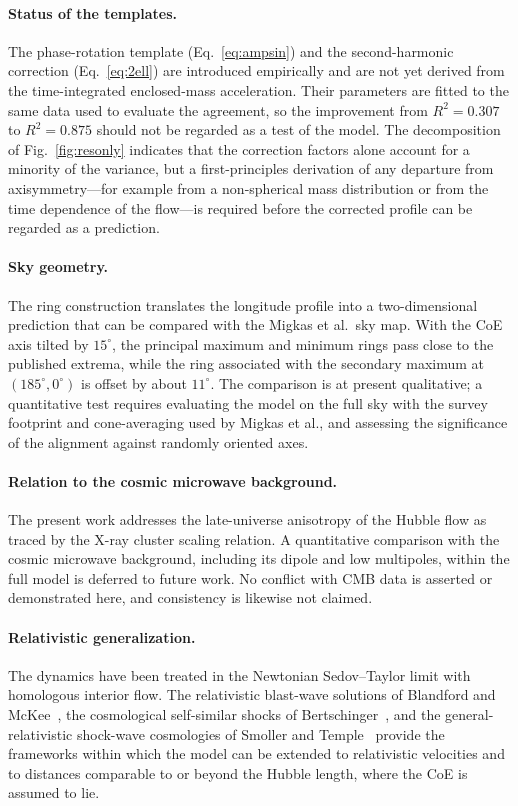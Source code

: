 \documentclass[11pt,letterpaper]{article}
\numberwithin{equation}{section}
\begin{document}
\paragraph{Status of the templates.}
The phase-rotation template (Eq.~\ref{eq:ampsin}) and the second-harmonic
correction (Eq.~\ref{eq:2ell}) are introduced empirically and are not yet
derived from the time-integrated enclosed-mass acceleration. Their parameters
are fitted to the same data used to evaluate the agreement, so the improvement
from $R^2=0.307$ to $R^2=0.875$ should not be regarded as a test of the model.
The decomposition of Fig.~\ref{fig:resonly} indicates that the correction
factors alone account for a minority of the variance, but a first-principles
derivation of any departure from axisymmetry---for example from a
non-spherical mass distribution or from the time dependence of the flow---is
required before the corrected profile can be regarded as a prediction.

\paragraph{Sky geometry.}
The ring construction translates the longitude profile into a
two-dimensional prediction that can be compared with the Migkas et al.\ sky
map. With the CoE axis tilted by $15^\circ$, the principal maximum and minimum
rings pass close to the published extrema, while the ring associated with the secondary maximum
at $(185^\circ,0^\circ)$ is offset by about $11^\circ$. The comparison is at present
qualitative; a quantitative test requires evaluating the model on the full
sky with the survey footprint and cone-averaging used by Migkas et al., and
assessing the significance of the alignment against randomly oriented axes.

\paragraph{Relation to the cosmic microwave background.}
The present work addresses the late-universe anisotropy of the Hubble flow
as traced by the X-ray cluster scaling relation. A quantitative comparison with
the cosmic microwave background, including its dipole and low multipoles,
within the full model is deferred to future work. No conflict with CMB data is
asserted or demonstrated here, and consistency is likewise not claimed.

\paragraph{Relativistic generalization.}
The dynamics have been treated in the Newtonian Sedov--Taylor limit with
homologous interior flow. The relativistic blast-wave solutions of Blandford
and McKee~\citep{BlandfordMcKee1976}, the cosmological self-similar shocks of
Bertschinger~\citep{Bertschinger1983}, and the general-relativistic shock-wave
cosmologies of Smoller and Temple~\citep{SmollerTemple2000,SmollerTemple2003}
provide the frameworks within which the model can be extended to relativistic
velocities and to distances comparable to or beyond the Hubble length, where
the CoE is assumed to lie.
\end{document}

